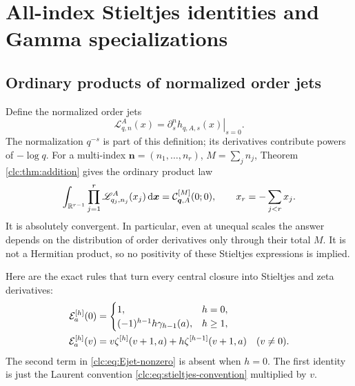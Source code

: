 \section{All-index Stieltjes identities and Gamma specializations}
\label{clc:sec:stieltjes}

\subsection{Ordinary products of normalized order jets}
Define the normalized order jets
\begin{equation}\label{clc:eq:Ljet}
 \mathscr L_{q,n}^{A}(x)=
       \left.\partial_s^n h_{q,A,s}(x)\right|_{s=0}.
\end{equation}
The normalization $q^{-s}$ is part of this definition; its derivatives
contribute powers of $-\log q$. For a multi-index
$\boldsymbol n=(n_1,\ldots,n_r)$, $M=\sum_jn_j$, Theorem
\ref{clc:thm:addition} gives the ordinary product law
\begin{equation}\label{clc:eq:jet-product}
 \int_{\mathbb R^{r-1}}\prod_{j=1}^r\mathscr L_{q_j,n_j}^{A}(x_j)
                  \,\mathrm d\boldsymbol x
 =\mathcal C_{\boldsymbol q,A}^{[M]}(0;0),\qquad x_r=-\sum_{j<r}x_j.
\end{equation}
It is absolutely convergent. In particular, even at unequal scales the
answer depends on the distribution of order derivatives only through
their total $M$. It is not a Hermitian product, so no positivity of
these Stieltjes expressions is implied.

Here are the exact rules that turn every central closure into Stieltjes
and zeta derivatives:
\begin{align}
 \mathcal E_a^{[h]}(0)&=
 \begin{cases}1,&h=0,\\(-1)^{h-1}h\gamma_{h-1}(a),&h\ge1,
 \end{cases}\label{clc:eq:Ejet}\\
 \mathcal E_a^{[h]}(v)&=v\zeta^{[h]}(v+1,a)
                +h\zeta^{[h-1]}(v+1,a)\quad(v\ne0).
 \label{clc:eq:Ejet-nonzero}
\end{align}
The second term in \eqref{clc:eq:Ejet-nonzero} is absent when $h=0$.
The first identity is just the Laurent convention
\eqref{clc:eq:stieltjes-convention} multiplied by $v$.

